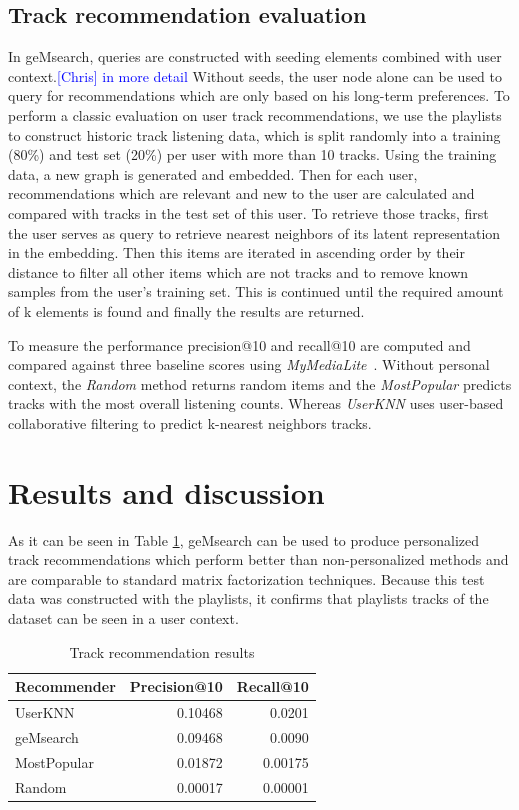 \documentclass[sigconf]{acmart}
\newcommand{\ce}[1]{\textcolor{blue}{[Chris] #1}}
\newcommand{\ce}[1]{}
\begin{document}
\subsection{Track recommendation evaluation}
\label{subsec:track_rec_eval}
In geMsearch, queries are constructed with seeding elements combined with user context.\ce{in more detail} Without seeds, the user node alone can be used to query for recommendations which are only based on his long-term preferences. To perform a classic evaluation on user track recommendations, we use the playlists to construct historic track listening data, which is split randomly into a training (80\%) and test set (20\%) per user with more than 10 tracks. Using the training data, a new graph is generated and embedded. Then for each user, recommendations which are relevant and new to the user are calculated and compared with tracks in the test set of this user. 
To retrieve those tracks, first the user serves as query to retrieve nearest neighbors of its latent representation in the embedding. Then this items are iterated in ascending order by their distance to filter all other items which are not tracks and to remove known samples from the user's training set. This is continued until the required amount of k elements is found and finally the results are returned.

To measure the performance precision@10 and recall@10 are computed and compared against three baseline scores using \emph{MyMediaLite}~\cite{Gantner2011MyMediaLite}. Without personal context, the \emph{Random} method returns random items and the \emph{MostPopular} predicts tracks with the most overall listening counts. Whereas \emph{UserKNN} uses user-based collaborative filtering to predict k-nearest neighbors tracks. 


\section{Results and discussion}
\label{sec:discussion}
As it can be seen in Table \ref{table:track_rec_results}, geMsearch can be used to produce personalized track recommendations which perform better than non-personalized methods and are comparable to standard matrix factorization techniques. Because this test data was constructed with the playlists, it confirms that playlists tracks of the dataset can be seen in a user context.

\begin{table}[H]
	\caption{Track recommendation results}
	\label{table:track_rec_results}
	\begin{tabular}{lrr}
		\midrule 
		\textbf{Recommender} & \textbf{Precision@10} & \textbf{Recall@10} \\ 
		\midrule 
		UserKNN   & 0.10468 & 0.0201  \\
		geMsearch   &  0.09468 &  0.0090  \\ %
		MostPopular   & 0.01872 & 0.00175  \\
		Random   & 0.00017 & 0.00001  \\
		\bottomrule
	\end{tabular}
\end{table}
\end{document}
